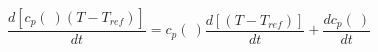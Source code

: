 \begin{equation}
\frac{d [c_p(\ ) (T- T_{ref})]}{dt} =c_p(\ ) \frac{d [ (T- T_{ref})]}{dt} + \frac{d c_p(\ )}{dt} 
\end{equation}